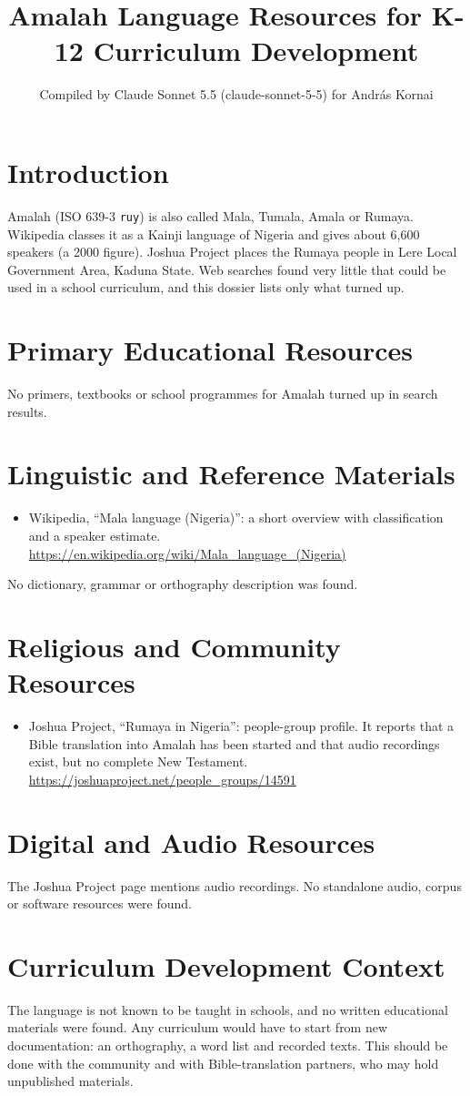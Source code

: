 \documentclass[12pt]{article}
\title{Amalah Language Resources for K-12 Curriculum Development}
\author{Compiled by Claude Sonnet 5.5 (claude-sonnet-5-5) for Andr\'as Kornai}
\date{}
\begin{document}
\maketitle

\section{Introduction}
Amalah (ISO 639-3 \texttt{ruy}) is also called Mala, Tumala, Amala or Rumaya. Wikipedia classes it as a Kainji language of Nigeria and gives about 6,600 speakers (a 2000 figure). Joshua Project places the Rumaya people in Lere Local Government Area, Kaduna State. Web searches found very little that could be used in a school curriculum, and this dossier lists only what turned up.

\section{Primary Educational Resources}
No primers, textbooks or school programmes for Amalah turned up in search results.

\section{Linguistic and Reference Materials}
\begin{itemize}
\item Wikipedia, ``Mala language (Nigeria)'': a short overview with classification and a speaker estimate. \url{https://en.wikipedia.org/wiki/Mala_language_(Nigeria)}
\end{itemize}
No dictionary, grammar or orthography description was found.

\section{Religious and Community Resources}
\begin{itemize}
\item Joshua Project, ``Rumaya in Nigeria'': people-group profile. It reports that a Bible translation into Amalah has been started and that audio recordings exist, but no complete New Testament. \url{https://joshuaproject.net/people_groups/14591}
\end{itemize}

\section{Digital and Audio Resources}
The Joshua Project page mentions audio recordings. No standalone audio, corpus or software resources were found.

\section{Curriculum Development Context}
The language is not known to be taught in schools, and no written educational materials were found. Any curriculum would have to start from new documentation: an orthography, a word list and recorded texts. This should be done with the community and with Bible-translation partners, who may hold unpublished materials.
\end{document}
